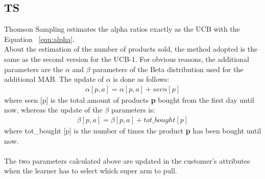 \subsection{TS}
Thomson Sampling estimates the alpha ratios exactly as the UCB with the Equation ~\ref{eqn:alpha}.\\About the estimation of the number of products sold, the method adopted is the same as the second version for the UCB-1. For obvious reasons, the additional parameters are the $\alpha$ and $\beta$ parameters of the Beta distribution used for the additional MAB. The update of $\alpha$ is done as follows:
\begin{align*}
    \alpha[p, a] = \alpha[p, a] + seen[p]
\end{align*}
where seen [p] is the total amount of products {\bf p} bought from the first day until now, whereas the update of the $\beta$ parameters is:
\begin{align*}
    \beta[p, a] = \beta [p, a] + tot\_bought[p]
\end{align*}
where tot\_bought [p] is the number of times the product {\bf p} has been bought until now.\\\\
The two parameters calculated above are updated in the customer's attributes when the learner has to select which super arm to pull.\\

